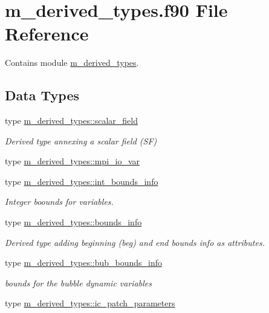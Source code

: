 \hypertarget{m__derived__types_8f90}{}\section{m\+\_\+derived\+\_\+types.\+f90 File Reference}
\label{m__derived__types_8f90}


Contains module \hyperlink{namespacem__derived__types}{m\+\_\+derived\+\_\+types}.  


\subsection*{Data Types}
\begin{DoxyCompactItemize}
\item 
type \hyperlink{structm__derived__types_1_1scalar__field}{m\+\_\+derived\+\_\+types\+::scalar\+\_\+field}
\begin{DoxyCompactList}\small\item\em Derived type annexing a scalar field (SF) \end{DoxyCompactList}\item 
type \hyperlink{structm__derived__types_1_1mpi__io__var}{m\+\_\+derived\+\_\+types\+::mpi\+\_\+io\+\_\+var}
\item 
type \hyperlink{structm__derived__types_1_1int__bounds__info}{m\+\_\+derived\+\_\+types\+::int\+\_\+bounds\+\_\+info}
\begin{DoxyCompactList}\small\item\em Integer boounds for variables. \end{DoxyCompactList}\item 
type \hyperlink{structm__derived__types_1_1bounds__info}{m\+\_\+derived\+\_\+types\+::bounds\+\_\+info}
\begin{DoxyCompactList}\small\item\em Derived type adding beginning (beg) and end bounds info as attributes. \end{DoxyCompactList}\item 
type \hyperlink{structm__derived__types_1_1bub__bounds__info}{m\+\_\+derived\+\_\+types\+::bub\+\_\+bounds\+\_\+info}
\begin{DoxyCompactList}\small\item\em bounds for the bubble dynamic variables \end{DoxyCompactList}\item 
type \hyperlink{structm__derived__types_1_1ic__patch__parameters}{m\+\_\+derived\+\_\+types\+::ic\+\_\+patch\+\_\+parameters}

\end{DoxyCompactItemize}

